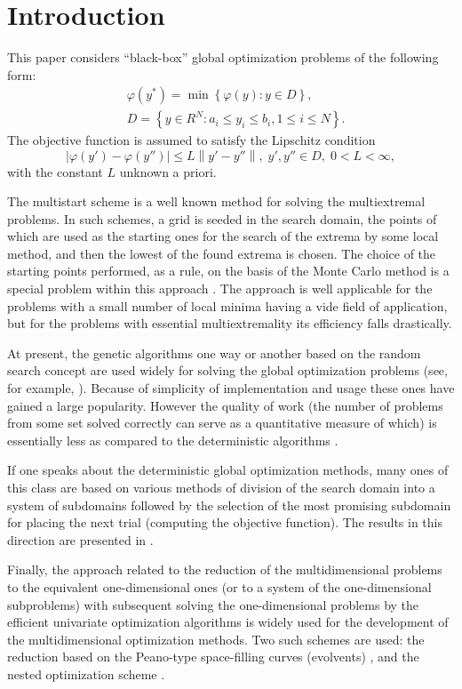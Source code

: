 \documentclass[runningheads]{llncs}
\begin{document}
\section{Introduction}
This paper considers ``black-box'' global optimization problems of the 
following form:
\begin{eqnarray}\label{main_problem}
& \varphi(y^\ast)=\min{\left\{\varphi(y):y\in D\right\}},\\
& D=\left\{y\in R^N: a_i\leq y_i \leq b_i, 1\leq i \leq N\right\}. \nonumber
\end{eqnarray}
The objective function is assumed to satisfy the Lipschitz condition 
\[
\left|\varphi(y')-\varphi(y'')\right|\leq L\left\|y'-y''\right\|,\; y',y'' \in
 D,\; 0<L<\infty,
\]
with the constant $L$ unknown a priori.

The multistart scheme is a well known method for solving the multiextremal problems.
In such schemes, a grid is seeded in the search domain, the points of which are used as the starting ones for the search of 
the extrema by some local method, and then the lowest of the found extrema is chosen. 
The choice of the starting points performed, as a rule, on the basis of the Monte Carlo method is a special problem within 
this approach \cite{Zhigljavsky2008}. 
The approach is well applicable for the problems with a small number of local minima having a vide field of application, 
but for the problems with essential multiextremality its efficiency falls drastically. 

At present, the genetic algorithms one way or another based on the random search concept are used widely for solving the 
global optimization problems (see, for example, \cite{Yang2013}). 
Because of simplicity of implementation and usage these ones have gained a large popularity. 
However the quality of work (the number of problems from some set solved correctly can serve as a quantitative measure 
of which) is essentially less as compared to the deterministic algorithms \cite{Kvasov2018,Sergeyev2018}.

If one speaks about the deterministic global optimization methods, many ones of this class are based on various methods 
of division of the search domain into a system of subdomains followed by the selection of the most promising subdomain 
for placing the next trial (computing the objective function). The results in this direction are presented in 
\cite{Evtushenko2013,Jones2009,Paulavicius2016,Zilinskas2010,Sergeyev2015}.

Finally, the approach related to the reduction of the multidimensional problems to the equivalent one-dimensional ones (or 
to a system of the one-dimensional subproblems) with subsequent solving the one-dimensional problems by the efficient 
univariate optimization algorithms is widely used for the development of the multidimensional 
optimization methods. Two such schemes are used: the reduction based on the Peano-type space-filling curves (evolvents) 
\cite{Sergeyev2013,Strongin2000}, and the nested optimization scheme \cite{Grishagin2001,Strongin2000}. 
\end{document}
